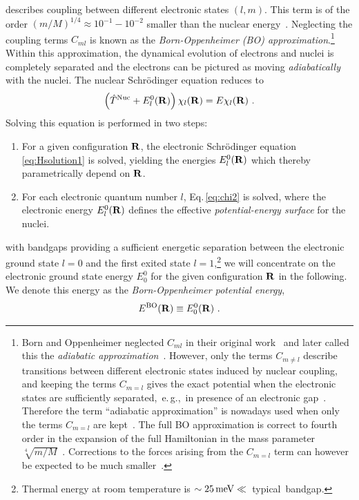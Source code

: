 describes coupling between different electronic states $(l, m)$. This term is of the order $(m/M)^{1/4} \approx 10^{-1} - 10^{-2}$ smaller than the nuclear energy~\cite{BornOppenheimer}. Neglecting the coupling terms $C_{ml}$ is known as the \emph{Born-Oppenheimer (BO) approximation}.\footnote[][0em]{Born and Oppenheimer neglected $C_{ml}$ in their original work~\cite{BornOppenheimer} and later called this the \emph{adiabatic approximation}~\cite{BornHuang}. However, only the terms $C_{m \neq l}$ describe transitions between different electronic states induced by nuclear coupling, and keeping the terms $C_{m=l}$ gives the exact potential when the electronic states are sufficiently separated,~e.\,g.,~in presence of an electronic gap~\cite{Born1951kopplung}. Therefore the term ``adiabatic approximation'' is nowadays used when only the terms $C_{m=l}$ are kept~\cite{Marx2009}. The full BO approximation is correct to fourth order in the expansion of the full Hamiltonian in the mass parameter $\sqrt[4]{m/M}$~\cite{BornHuang}. Corrections to the forces arising from the $C_{m=l}$ term can however be expected to be much smaller~\cite{Ziman1955}.
} Within this approximation, the dynamical evolution of electrons and nuclei is completely separated and the electrons can be pictured as moving \emph{adiabatically} with the nuclei. The nuclear Schr\"odinger equation reduces to
\begin{align}
    \left( \hat{T}^{\rm Nuc} + E^0_l({\bf R}) \right) \chi_l ({\bf R})
        = E \chi_l ({\bf R})~.
    \label{eq:chi2}
\end{align}
Solving this equation is performed in two steps:
\begin{enumerate}
    \item For a given configuration $\bf R$, the electronic Schr\"odinger equation \eqref{eq:Hsolution1} is solved, yielding the energies $E^0_l({\bf R})$ which thereby parametrically depend on $\bf R$.
    \item For each electronic quantum number $l$, Eq.\,\eqref{eq:chi2} is solved, where the electronic energy $E^0_l({\bf R})$ defines the effective \emph{potential-energy surface} for the nuclei.
\end{enumerate}

 with bandgaps providing a sufficient energetic separation between the electronic ground state $l=0$ and the first exited state $l=1$,\footnote{Thermal energy at room temperature is \mbox{$\sim 25\,{\rm meV} \ll $~typical bandgap}.} we will concentrate on the electronic ground state energy $E^0_0$ for the given configuration ${\bf R}$ in the following. We denote this energy as the \emph{Born-Oppenheimer potential energy},
\begin{align}
	E^{\rm BO} ({\bf R}) \equiv E^0_0 ({\bf R})~.
	\label{eq:E^BO_0}
\end{align}

